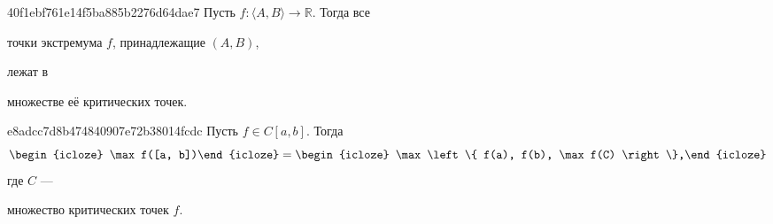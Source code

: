 \begin{note}{40f1ebf761e14f5ba885b2276d64dae7}
    Пусть \( f : \langle A, B \rangle \to \mathbb R  \). Тогда все
    \begin{icloze}{2}точки экстремума \( f \), принадлежащие \( (A, B) \),\end{icloze}
    лежат в \begin{icloze}{1}множестве её критических точек.\end{icloze}
\end{note}

\begin{note}{e8adcc7d8b474840907e72b38014fcdc}
    Пусть \( f \in C[a, b] \). Тогда
    \[
        \begin{icloze}{3}\max f([a, b])\end{icloze} = \begin{icloze}{1}\max \left\{ f(a), f(b), \max f(C) \right\},\end{icloze}
    \]
    где \( C \) --- \begin{icloze}{2}множество критических точек \( f \).\end{icloze}
\end{note}


